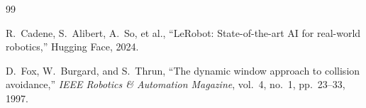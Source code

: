 \documentclass[letterpaper, 10pt, twocolumn]{IEEEtran}
\begin{document}





\begin{thebibliography}{99}

R.~Cadene, S.~Alibert, A.~So, et al.,
``LeRobot: State-of-the-art AI for real-world robotics,''
Hugging Face, 2024.

D.~Fox, W.~Burgard, and S.~Thrun,
``The dynamic window approach to collision avoidance,''
\textit{IEEE Robotics \& Automation Magazine}, vol.~4, no.~1, pp.~23--33, 1997.


\end{thebibliography}
\end{document}
